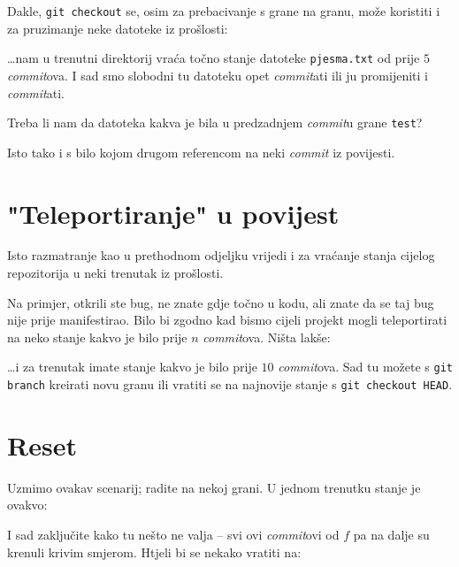 Dakle, \verb+git checkout+ se, osim za prebacivanje s grane na granu, može koristiti i za pruzimanje neke datoteke iz prošlosti:


\dots{}nam u trenutni direktorij vraća točno stanje datoteke \verb+pjesma.txt+ od prije $5$ \emph{commit}ova.
I sad smo slobodni tu datoteku opet \emph{commit}ati ili ju promijeniti i \emph{commit}ati.

Treba li nam da datoteka kakva je bila u predzadnjem \emph{commit}u grane \verb+test+?


Isto tako i s bilo kojom drugom referencom na neki \emph{commit} iz povijesti.

\section*{"Teleportiranje" u povijest}

Isto razmatranje kao u prethodnom odjeljku vrijedi i za vraćanje stanja cijelog repozitorija u neki trenutak iz prošlosti.

Na primjer, otkrili ste bug, ne znate gdje točno u kodu, ali znate da se taj bug nije prije manifestirao. 
Bilo bi zgodno kad bismo cijeli projekt mogli teleportirati na neko stanje kakvo je bilo prije $n$ \emph{commit}ova.
Ništa lakše:


\dots{}i za trenutak imate stanje kakvo je bilo prije $10$ \emph{commit}ova. Sad tu možete s \verb+git branch+ kreirati novu granu ili vratiti se na najnovije stanje s \verb+git checkout HEAD+.

\section*{Reset}

Uzmimo ovakav scenarij; radite na nekoj grani.
U jednom trenutku stanje je ovakvo:



I sad zaključite kako tu nešto ne valja -- svi ovi \emph{commit}ovi od $f$ pa na dalje su krenuli krivim smjerom.
Htjeli bi se nekako vratiti na:

